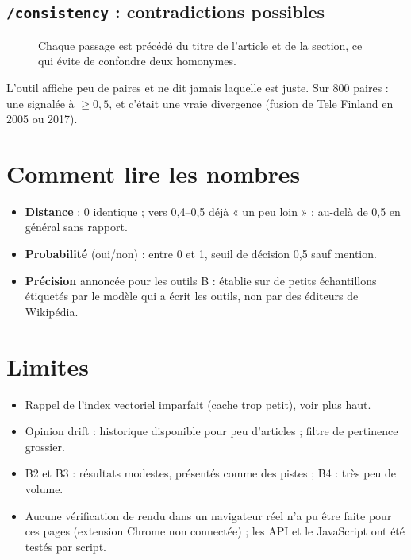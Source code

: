 \documentclass[11pt,a4paper]{article}
\begin{document}
\subsection{\texttt{/consistency} : contradictions possibles}
\begin{figure}[H]\centering
{}
\caption{Chaque passage est précédé du titre de l'article et de la section, ce qui évite de confondre deux homonymes.}
\end{figure}
L'outil affiche peu de paires et ne dit jamais laquelle est juste. Sur 800 paires : une signalée à $\geq 0{,}5$, et c'était une vraie divergence (fusion de Tele Finland en 2005 ou 2017).

\section{Comment lire les nombres}
\begin{itemize}[nosep]
\item \textbf{Distance} : 0 identique ; vers 0,4--0,5 déjà « un peu loin » ; au-delà de 0,5 en général sans rapport.
\item \textbf{Probabilité} (oui/non) : entre 0 et 1, seuil de décision 0,5 sauf mention.
\item \textbf{Précision} annoncée pour les outils B : établie sur de petits échantillons étiquetés par le modèle qui a écrit les outils, non par des éditeurs de Wikipédia.
\end{itemize}

\section{Limites}
\begin{itemize}[nosep]
\item Rappel de l'index vectoriel imparfait (cache trop petit), voir plus haut.
\item Opinion drift : historique disponible pour peu d'articles ; filtre de pertinence grossier.
\item B2 et B3 : résultats modestes, présentés comme des pistes ; B4 : très peu de volume.
\item Aucune vérification de rendu dans un navigateur réel n'a pu être faite pour ces pages (extension Chrome non connectée) ; les API et le JavaScript ont été testés par script.
\end{itemize}
\end{document}
